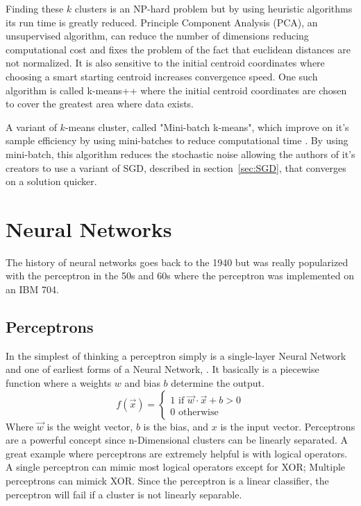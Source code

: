Finding these $k$ clusters is an NP-hard problem but by using heuristic algorithms its run time is greatly reduced. Principle Component Analysis (PCA), an unsupervised algorithm, can reduce the number of dimensions reducing computational cost and fixes the problem of the fact that euclidean distances are not normalized. It is also sensitive to the initial centroid coordinates where choosing a smart starting centroid increases convergence speed. One such algorithm is called k-means++ \cite{arthur2006k} where the initial centroid coordinates are chosen to cover the greatest area where data exists.

A variant of $k$-means cluster, called "Mini-batch k-means", which improve on it's sample efficiency by using mini-batches to reduce computational time \cite{sculley2010web}. By using mini-batch, this algorithm reduces the stochastic noise allowing the authors of it's creators to use a variant of SGD, described in section~\ref{sec:SGD}, that converges on a solution quicker.

\section{Neural Networks}

The history of neural networks goes back to the 1940 but was really popularized with the perceptron in the 50s and 60s where the perceptron was implemented on an IBM 704.

\subsection{Perceptrons}

In the simplest of thinking a perceptron simply is a single-layer Neural Network and one of earliest forms of a Neural Network, \cite{rosenblatt_1958}. It basically is a piecewise function where a weights $w$ and bias $b$ determine the output. $$f(\vec{x})=\begin{cases}
1 \mbox{ if } \vec{w}\cdot \vec{x}+b>0 \\
0 \mbox{ otherwise }
\end{cases}$$ Where $\vec{w}$  is the weight vector, $b$ is the bias, and $x$ is the input vector.  Perceptrons are a powerful concept since n-Dimensional clusters can be linearly separated. A great example where perceptrons are extremely helpful is with logical operators. A single perceptron can mimic most logical operators except for XOR; Multiple perceptrons can mimick XOR. Since the perceptron is a linear classifier, the perceptron will fail if a cluster is not linearly separable. 

